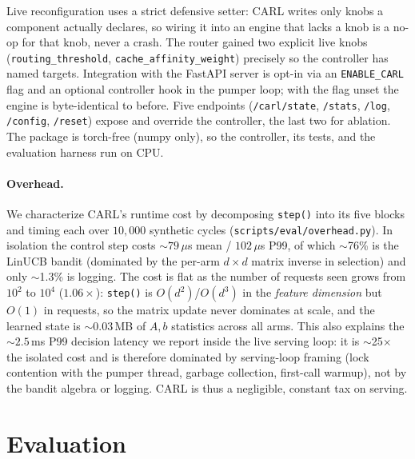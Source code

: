 \documentclass[10pt,twocolumn]{article}
\begin{document}
Live reconfiguration uses a strict defensive setter: CARL writes only knobs a
component actually declares, so wiring it into an engine that lacks a knob is a
no-op for that knob, never a crash. The router gained two explicit live knobs
(\texttt{routing\_threshold}, \texttt{cache\_affinity\_weight}) precisely so the
controller has named targets. Integration with the FastAPI server is opt-in via
an \texttt{ENABLE\_CARL} flag and an optional controller hook in the pumper loop;
with the flag unset the engine is byte-identical to before. Five endpoints
(\texttt{/carl/state}, \texttt{/stats}, \texttt{/log}, \texttt{/config},
\texttt{/reset}) expose and override the controller, the last two for ablation.
The package is torch-free (numpy only), so the controller, its tests, and the
evaluation harness run on CPU.

\paragraph{Overhead.} We characterize CARL's runtime cost by decomposing
\texttt{step()} into its five blocks and timing each over $10{,}000$ synthetic
cycles (\texttt{scripts/eval/overhead.py}). In isolation the control step costs
$\sim$$79\,\mu$s mean / $102\,\mu$s P99, of which $\sim$76\% is the LinUCB bandit
(dominated by the per-arm $d\times d$ matrix inverse in selection) and only
$\sim$1.3\% is logging. The cost is flat as the number of requests seen grows
from $10^2$ to $10^4$ ($1.06\times$): \texttt{step()} is $O(d^2)$/$O(d^3)$ in the
\emph{feature dimension} but $O(1)$ in requests, so the matrix update never
dominates at scale, and the learned state is $\sim$$0.03$\,MB of $A,b$ statistics
across all arms. This also explains the $\sim$$2.5$\,ms P99 decision latency we
report inside the live serving loop: it is $\sim$25$\times$ the isolated cost and
is therefore dominated by serving-loop framing (lock contention with the pumper
thread, garbage collection, first-call warmup), not by the bandit algebra or
logging. CARL is thus a negligible, constant tax on serving.

\section{Evaluation}
\label{sec:eval}
\end{document}
